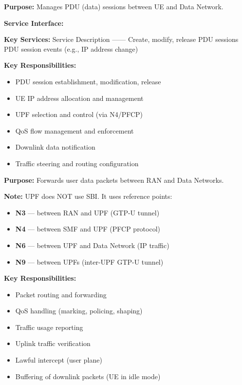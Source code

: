
\textbf{Purpose:} Manages PDU (data) sessions between UE and Data Network.

\textbf{Service Interface:} 

\textbf{Key Services:}\CNbr{}\textbar{} Service \textbar{} Description \textbar{}\CNbr{}\textbar{}—\textbar{}—\textbar{}\CNbr{}\textbar{}  \textbar{} Create, modify, release PDU sessions \textbar{}\CNbr{}\textbar{}  \textbar{} PDU session events (e.g., IP address change) \textbar{}

\textbf{Key Responsibilities:}

\begin{itemize}
\tightlist
\item
  PDU session establishment, modification, release
\item
  UE IP address allocation and management
\item
  UPF selection and control (via N4/\allowbreak{}PFCP)
\item
  QoS flow management and enforcement
\item
  Downlink data notification
\item
  Traffic steering and routing configuration
\end{itemize}


\textbf{Purpose:} Forwards user data packets between RAN and Data Networks.

\textbf{\CNwarn{} Note:} UPF does NOT use SBI. It uses reference points:

\begin{itemize}
\tightlist
\item
  \textbf{N3} — between RAN and UPF (GTP-U tunnel)
\item
  \textbf{N4} — between SMF and UPF (PFCP protocol)
\item
  \textbf{N6} — between UPF and Data Network (IP traffic)
\item
  \textbf{N9} — between UPFs (inter-UPF GTP-U tunnel)
\end{itemize}

\textbf{Key Responsibilities:}

\begin{itemize}
\tightlist
\item
  Packet routing and forwarding
\item
  QoS handling (marking, policing, shaping)
\item
  Traffic usage reporting
\item
  Uplink traffic verification
\item
  Lawful intercept (user plane)
\item
  Buffering of downlink packets (UE in idle mode)
\end{itemize}

